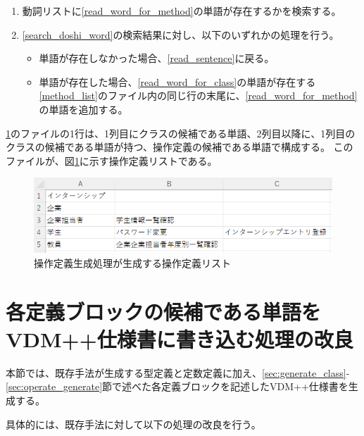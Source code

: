 \begin{enumerate}
\begin{enumerate}
\begin{enumerate}
                    \item 動詞リストに\ref{read_word_for_method}の単語が存在するかを検索する。
                    \label{search_doshi_word}
                    \item \ref{search_doshi_word}の検索結果に対し、以下のいずれかの処理を行う。
                        \begin{itemize}
                            \item 単語が存在しなかった場合、\ref{read_sentence}に戻る。
                            \item 単語が存在した場合、\ref{read_word_for_class}の単語が存在する\ref{method_list}のファイル内の同じ行の末尾に、\ref{read_word_for_method}の単語を追加する。
                        \end{itemize}
                \end{enumerate}
        \end{enumerate}
\end{enumerate}

\ref{fig:operate_list}のファイルの1行は、1列目にクラスの候補である単語、2列目以降に、1列目のクラスの候補である単語が持つ、操作定義の候補である単語で構成する。
このファイルが、図\ref{fig:operate_list}に示す操作定義リストである。

\begin{figure}[t]
    \begin{center}
        \includegraphics[width=1.0\columnwidth]{image/operate_list.png}
        \caption{操作定義生成処理が生成する操作定義リスト}
        \label{fig:operate_list}
    \end{center}
\end{figure}

\section{各定義ブロックの候補である単語をVDM++仕様書に書き込む処理の改良}
本節では、既存手法が生成する型定義と定数定義に加え、\ref{sec:generate_class}-\ref{sec:operate_generate}節で述べた各定義ブロックを記述したVDM++仕様書を生成する。

具体的には、既存手法に対して以下の処理の改良を行う。

